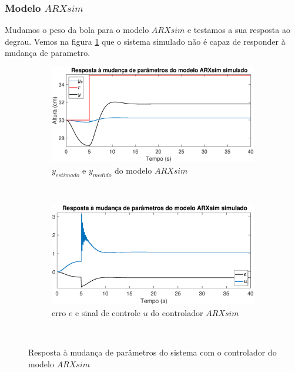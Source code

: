 \subsubsection{Modelo $ARXsim$}

Mudamos o peso da bola para o modelo $ARXsim$ e testamos a sua resposta ao degrau. Vemos na figura \ref{fig:mpsarxsimy} que o sistema simulado não é capaz de responder à mudança de parametro.

\begin{figure}[htb]
	\centering
	\begin{subfigure}[t]{0.48\textwidth}
		\includegraphics[width=1\linewidth]{pasta1_figuras/mpsarxsimy}
		\caption[$y_{estimado}$ e $y_{medido}$ do modelo $ARX2$]{$y_{estimado}$ e $y_{medido}$ do modelo $ARXsim$}
		\label{fig:mpsarxsimy}
	\end{subfigure}
	~ %
	\begin{subfigure}[t]{0.48\textwidth}
		\includegraphics[width=1\linewidth]{pasta1_figuras/mpsarxsime}
		\caption[erro $e$ e sinal de controle $u$ do controlador $ARX2$]{erro $e$ e sinal de controle $u$ do controlador $ARXsim$}
		\label{fig:mpsarxsime}
	\end{subfigure}
	~ %
	
	\caption{Resposta à mudança de parâmetros do sistema com o controlador do modelo $ARXsim$}\label{fig:mpsarxsim}
\end{figure}

